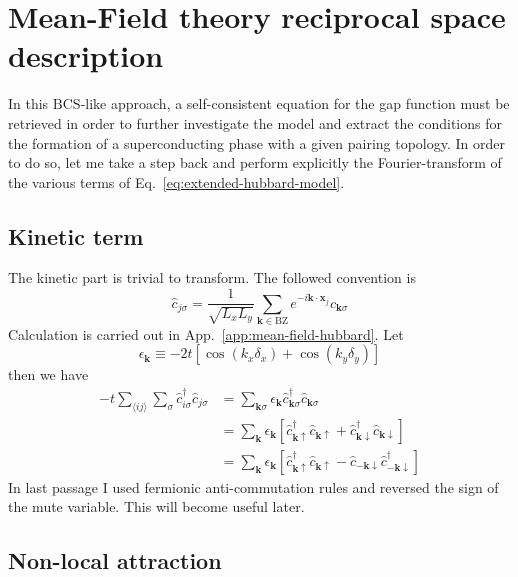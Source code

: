 \section{Mean-Field theory reciprocal space description}\label{sec:mft-solution-reciprocal-space}

In this $\mathrm{BCS}$-like approach, a self-consistent equation for the gap function must be retrieved in order to further investigate the model and extract the conditions for the formation of a superconducting phase with a given pairing topology. In order to do so, let me take a step back and perform explicitly the Fourier-transform of the various terms of Eq.~\ref{eq:extended-hubbard-model}.

\subsection{Kinetic term}

The kinetic part is trivial to transform. The followed convention is
\[
	\hat c_{j\sigma} = \frac{1}{\sqrt{L_xL_y}} \sum_{\mathbf{k} \in \mathrm{BZ}} e^{-i \mathbf{k} \cdot \mathbf{x}_j} \hat c_{\mathbf{k}\sigma}
\]
Calculation is carried out in App.~\ref{app:mean-field-hubbard}. Let
\[
	\epsilon_\mathbf{k} \equiv -2t \left[
	\cos(k_x \delta_x) + \cos(k_y \delta_y)
	\right]
\]
then we have
\[
\begin{aligned}
	-t \sum_{\langle ij \rangle} \sum_\sigma \hat c_{i\sigma}^\dagger \hat c_{j\sigma} &= \sum_{\mathbf{k}\sigma} \epsilon_\mathbf{k} \hat c_{\mathbf{k}\sigma}^\dagger \hat c_{\mathbf{k}\sigma} \\
	&= \sum_\mathbf{k} \epsilon_\mathbf{k} \left[
	\hat c_{\mathbf{k}\uparrow}^\dagger \hat c_{\mathbf{k}\uparrow} + \hat c_{\mathbf{k}\downarrow}^\dagger \hat c_{\mathbf{k}\downarrow}
	\right] \\
	&= \sum_\mathbf{k} \epsilon_\mathbf{k} \left[
	\hat c_{\mathbf{k}\uparrow}^\dagger \hat c_{\mathbf{k}\uparrow}- \hat c_{-\mathbf{k}\downarrow} \hat c_{-\mathbf{k}\downarrow}^\dagger 
	\right]
\end{aligned}
\]
In last passage I used fermionic anti-commutation rules and reversed the sign of the mute variable. This will become useful later.

\subsection{Non-local attraction}

